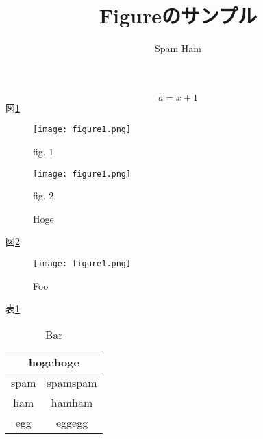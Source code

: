 \documentclass[11pt]{jarticle}
\begin{document}
\title{Figureのサンプル}
\author{Spam Ham}
\date{}
\maketitle

\begin{equation}
	a = x + 1
\end{equation}
図\ref{1}
\begin{figure}[htbp]
  \begin{center}
    \begin{minipage}{0.48\hsize}
      \begin{center}
	\texttt{[image: figure1.png]}
      \end{center}
      \begin{center}
	fig. 1
      \end{center}
    \end{minipage}		
    \hfil
    \begin{minipage}{0.48\hsize}
      \begin{center}
	\texttt{[image: figure1.png]}
      \end{center}
      \begin{center}
	fig. 2 
      \end{center}
    \end{minipage}
    \caption{Hoge}
    \label{1}
    \end{center}
\end{figure}

図\ref{2}
\begin{figure}[H]
  \begin{center}
    \texttt{[image: figure1.png]}
    \vspace{-0.5cm}
    \caption{Foo}
    \label{2}
  \end{center}
\end{figure}

表\ref{3}
\begin{table}[htbp]
  \centering
  \caption{Bar}
  \label{3}
  \begin{tabular}{|c|c|} \hline
    \multicolumn{2}{|c|}{hogehoge}\\ \hline
    spam & spamspam \\ \hline
    ham & hamham \\ \hline
    egg & eggegg \\ \hline
  \end{tabular}
\end{table}
\end{document}

